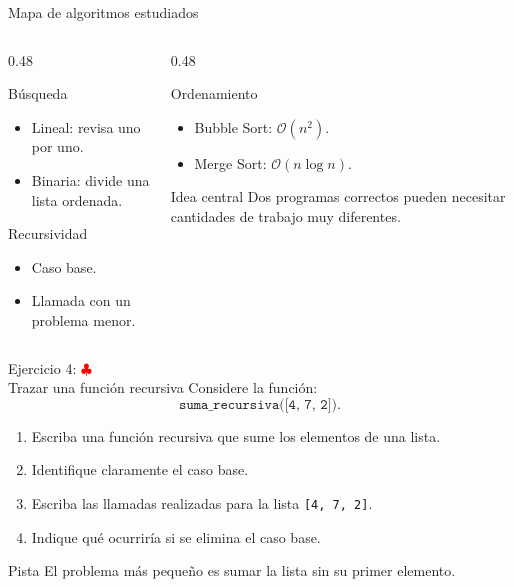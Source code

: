 \documentclass[10pt]{beamer}
\begin{document}
\begin{frame}{Mapa de algoritmos estudiados}
  \begin{columns}
    \begin{column}{0.48\textwidth}
      \begin{block}{Búsqueda}
        \begin{itemize}
          \item Lineal: revisa uno por uno.
          \item Binaria: divide una lista ordenada.
        \end{itemize}
      \end{block}

      \begin{block}{Recursividad}
        \begin{itemize}
          \item Caso base.
          \item Llamada con un problema menor.
        \end{itemize}
      \end{block}
    \end{column}
    \begin{column}{0.48\textwidth}
      \begin{block}{Ordenamiento}
        \begin{itemize}
          \item Bubble Sort: \(\mathcal{O}(n^2)\).
          \item Merge Sort: \(\mathcal{O}(n\log n)\).
        \end{itemize}
      \end{block}

      \begin{alertblock}{Idea central}
        Dos programas correctos pueden necesitar cantidades de trabajo muy diferentes.
      \end{alertblock}
    \end{column}
  \end{columns}
\end{frame}

\begin{frame}{Ejercicio 4: \hfill \textcolor{red}{$\clubsuit$} \\ Trazar una función recursiva}
  Considere la función:
  \[
    \texttt{suma\_recursiva([4, 7, 2])}.
  \]

  \begin{enumerate}
    \item Escriba una función recursiva que sume los elementos de una lista.
    \item Identifique claramente el caso base.
    \item Escriba las llamadas realizadas para la lista \texttt{[4, 7, 2]}.
    \item Indique qué ocurriría si se elimina el caso base.
  \end{enumerate}

  \begin{alertblock}{Pista}
    El problema más pequeño es sumar la lista sin su primer elemento.
  \end{alertblock}
\end{frame}
\end{document}
